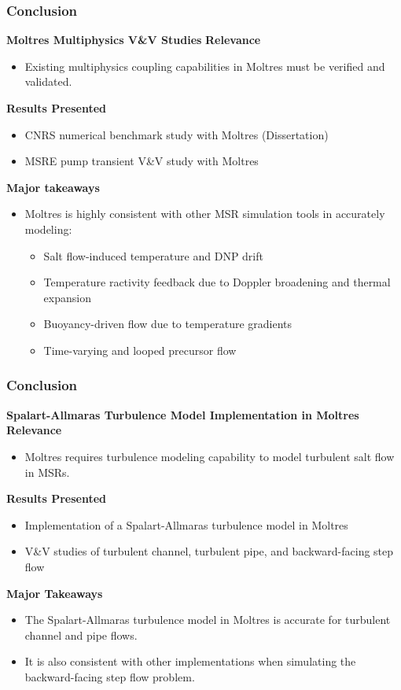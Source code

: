 \begin{frame}
  \frametitle{Conclusion}
  \begin{block}{\textbf{Moltres Multiphysics V\&V Studies}}
    \textbf{Relevance}
    \begin{itemize}
      \item Existing multiphysics coupling capabilities in Moltres must be verified and validated.
    \end{itemize}
    \textbf{Results Presented}
    \begin{itemize}
      \item CNRS numerical benchmark study with Moltres (Dissertation)
      \item MSRE pump transient V\&V study with Moltres
    \end{itemize}
    \textbf{Major takeaways}
    \begin{itemize}
      \item Moltres is highly consistent with other MSR simulation tools in accurately modeling:
      \begin{itemize}
        \item Salt flow-induced temperature and DNP drift
        \item Temperature ractivity feedback due to Doppler broadening and thermal expansion
        \item Buoyancy-driven flow due to temperature gradients
        \item Time-varying and looped precursor flow
      \end{itemize}
    \end{itemize}
  \end{block}
\end{frame}

\begin{frame}
  \frametitle{Conclusion}
  \begin{block}{\textbf{Spalart-Allmaras Turbulence Model Implementation in Moltres}}
    \textbf{Relevance}
    \begin{itemize}
      \item Moltres requires turbulence modeling capability to model turbulent salt
        flow in MSRs.
    \end{itemize}
    \textbf{Results Presented}
    \begin{itemize}
      \item Implementation of a Spalart-Allmaras turbulence model in Moltres
      \item V\&V studies of turbulent channel, turbulent pipe, and backward-facing step flow
    \end{itemize}
    \textbf{Major Takeaways}
    \begin{itemize}
      \item The Spalart-Allmaras turbulence model in Moltres is accurate for turbulent channel and
        pipe flows.
      \item It is also consistent with other implementations when simulating the
        backward-facing step flow problem.
    \end{itemize}
  \end{block}
\end{frame}

